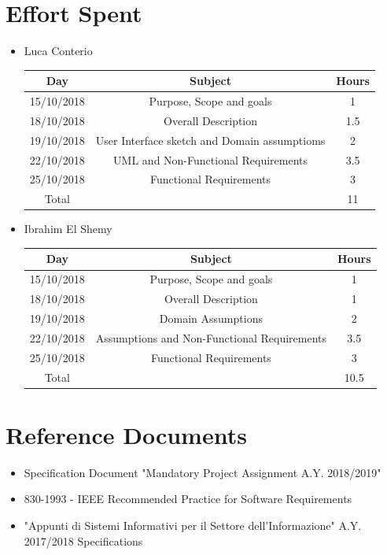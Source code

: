 \documentclass[12pt,a4paper]{article}
\begin{document}
	\section{Effort Spent}
	\begin{itemize}
		\item Luca Conterio
		\begin{center}
			\begin{tabular}{| c | c | c |}
				\hline
				Day & Subject & Hours \\ \hline
				15/10/2018 & Purpose, Scope and goals & 1 \\
				18/10/2018 & Overall Description & 1.5 \\
				19/10/2018  & User Interface sketch and Domain assumptioms & 2 \\
				22/10/2018  & UML and Non-Functional Requirements & 3.5 \\
				25/10/2018 & Functional Requirements & 3 \\
				\hline
				Total & & 11\\
				\hline
			\end{tabular}
		\end{center}
		
		\item Ibrahim El Shemy
		\begin{center}
			\begin{tabular}{| c | c | c |}
				\hline
				Day & Subject & Hours \\ \hline
				15/10/2018 & Purpose, Scope and goals & 1 \\
				18/10/2018 & Overall Description & 1 \\
				19/10/2018  & Domain Assumptions & 2 \\
				22/10/2018  & Assumptions and Non-Functional Requirements & 3.5 \\
				25/10/2018 & Functional Requirements & 3 \\
				\hline
				Total & & 10.5\\
				\hline
			\end{tabular}
		\end{center}
	\end{itemize}
	\section{Reference Documents}
	\begin{itemize}
		\item Specification Document "Mandatory Project Assignment A.Y. 2018/2019"
		\item 830-1993 - IEEE Recommended Practice for Software Requirements
		\item "Appunti di Sistemi Informativi per il Settore dell'Informazione" A.Y. 2017/2018
		Specifications
	\end{itemize}
\end{document}
